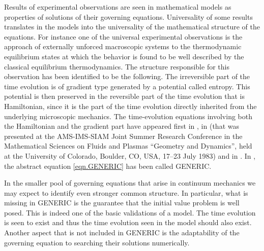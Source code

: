 \documentclass[twoside]{article}
\begin{document}
Results of experimental observations are seen in mathematical  models as 
properties of solutions of their governing equations. Universality of some 
results translates in the models into the universality of the mathematical 
structure of the equations. For instance one of the universal experimental 
observations is the  approach of externally unforced macroscopic systems to the 
thermodynamic equilibrium states at which the behavior is found to be well 
described by the classical equilibrium thermodynamics. The structure 
responsible for this observation has been identified to be the following. The 
irreversible part of the time evolution is of gradient type generated by a 
potential called entropy. This potential is then preserved in the reversible 
part of the time evolution that is Hamiltonian, since it is the part of the 
time evolution directly inherited from the underlying microscopic mechanics.  
The time-evolution equations involving both the
Hamiltonian and the gradient part have appeared first in 
\cite{Dzyaloshinskii1980}, in \cite{GC} (that was presented at
the AMS-IMS-SIAM Joint Summer Research Conference in the Mathematical Sciences 
on Fluids and Plasmas ``Geometry and Dynamics'', held at the University of 
Colorado, Boulder, CO, USA, 17--23 July 1983) and in  
\cite{kauf,mor,GPhD,Beris1994,GrmelaOttingerI,GrmelaOttingerII,Ottinger-book}.  In \cite{GrmelaOttingerI,GrmelaOttingerII}, the 
abstract equation \eqref{eqn.GENERIC}  has been called GENERIC.


 
In the  smaller pool of governing equations  that arise  in continuum mechanics 
we may expect to identify even stronger common structure. In particular, what 
is missing in  GENERIC is the guarantee that the initial value problem is well 
posed. This is indeed one of the basic validations of a model. The time 
evolution is seen to exist and thus the time evolution seen  in the model 
should also exist. Another aspect that is not included  in GENERIC is the 
adaptability of the governing equation to searching their solutions 
numerically. 
\end{document}
